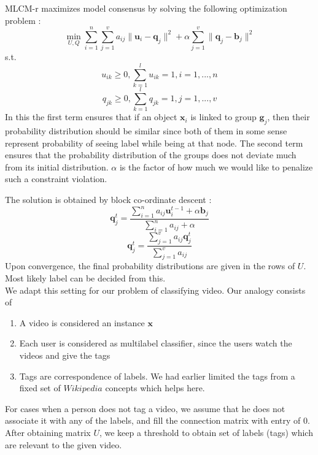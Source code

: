 \documentclass[12pt]{report}
\begin{document}
MLCM-r maximizes model consensus by solving the following optimization problem :
\begin{equation}
\min_{U, Q} \sum_{i=1}^n\sum_{j=1}^v a_{ij}\|\boldsymbol{u}_i - \boldsymbol{q}_j\|^2 + \alpha\sum_{j=1}^v\|\boldsymbol{q}_j-\boldsymbol{b}_j\|^2
\end{equation}
s.t.
\begin{equation}
u_{ik}\geq 0, \sum_{k=1}^l u_{ik} = 1, i = 1,...,n
\end{equation}
\begin{equation}
q_{jk}\geq 0, \sum_{k=1}^l q_{jk} = 1, j = 1,...,v
\end{equation}
In this the first term ensures that if an object $\boldsymbol{x}_i$ is linked to group $\boldsymbol{g}_j$, then their probability distribution should be similar since both of them in some sense represent probability of seeing label while being at that node. The second term ensures that the probability distribution of the groups does not deviate much from its initial distribution. $\alpha$ is the factor of how much we would like to penalize such a constraint violation.

The solution\cite{BGCM} is obtained by block co-ordinate descent :
\begin{equation}
\boldsymbol{q}_j^t = \frac{\sum_{i=1}^n a_{ij}\boldsymbol{u}_i^{t-1} + \alpha \boldsymbol{b}_j}{\sum_{i=1}^n a_{ij} + \alpha}
\end{equation}
\begin{equation}
\boldsymbol{q}_j^t=\frac{\sum_{j=1}^va_{ij}\boldsymbol{q}_j^t}{\sum_{j=1}^va_{ij}}
\end{equation}
Upon convergence, the final probability distributions are given in the rows of $U$. Most likely label can be decided from this.
\vspace{1em}\\
We adapt this setting for our problem of classifying video. Our analogy consists of
\begin{enumerate}
\item A video is considered an instance $\boldsymbol{x}$
\item Each user is considered as multilabel classifier, since the users watch the videos and give the tags
\item Tags are correspondence of labels. We had earlier limited the tags from a fixed set of $Wikipedia$ concepts which helps here.
\end{enumerate}
For cases when a person does not tag a video, we assume that he does not associate it with any of the labels, and fill the connection matrix with entry of $0$. After obtaining matrix $U$, we keep a threshold to obtain set of labels (tags) which are relevant to the given video.
\end{document}
